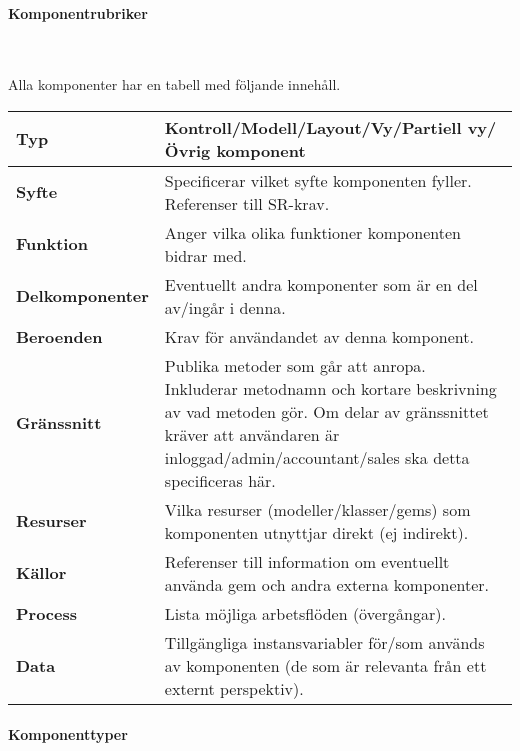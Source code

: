 \documentclass[a4paper, twoside, 11pt, titlepage]{article}
\begin{document}
			\paragraph{Komponentrubriker}\

			Alla komponenter har en tabell med följande innehåll.

			\begin {table} [ht] \begin{tabular} { p{2.6cm} p{12.5cm} }
				\hline
				{\sffamily\textbf{Typ}} & {Kontroll/Modell/Layout/Vy/Partiell vy/Övrig komponent} \\
				\hline
				{\sffamily\textbf{Syfte}} & {Specificerar vilket syfte komponenten fyller. Referenser till SR-krav.} \\
				\hline
				{\sffamily\textbf{Funktion}} & {Anger vilka olika funktioner komponenten bidrar med.} \\
				\hline
				{\sffamily\textbf{Delkomponenter}} & {Eventuellt andra komponenter som är en del av/ingår i denna.} \\
				\hline
				{\sffamily\textbf{Beroenden}} & {Krav för användandet av denna komponent.} \\
				\hline
				{\sffamily\textbf{Gränssnitt}} & {Publika metoder som går att anropa. Inkluderar metodnamn och kortare beskrivning av vad metoden gör. Om delar av gränssnittet kräver att användaren är inloggad/admin/accountant/sales ska detta specificeras här.} \\
				\hline
				{\sffamily\textbf{Resurser}} & {Vilka resurser (modeller/klasser/gems) som komponenten utnyttjar direkt (ej indirekt).} \\
				\hline
				{\sffamily\textbf{Källor}} & {Referenser till information om eventuellt använda gem och andra externa komponenter.} \\
				\hline
				{\sffamily\textbf{Process}} & {Lista möjliga arbetsflöden (övergångar).} \\
				\hline
				{\sffamily\textbf{Data}} & {Tillgängliga instansvariabler för/som används av komponenten (de som är relevanta från ett externt perspektiv).} \\
				\hline
			\end{tabular} \end{table} \FloatBarrier


			\clearpage %
			\paragraph{Komponenttyper}\
\end{document}
